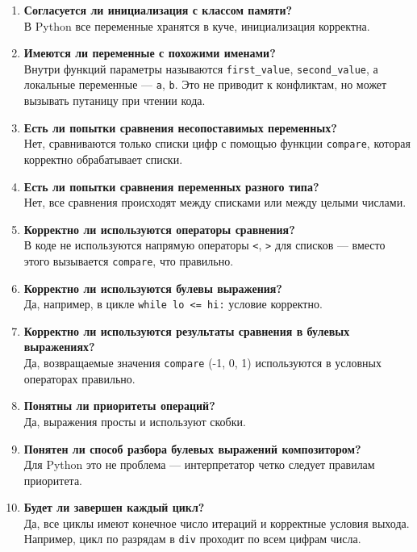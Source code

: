 \documentclass{article}[14pt]
\begin{document}
\begin{enumerate}
\item \textbf{Согласуется ли инициализация с классом памяти?}
\\
В Python все переменные хранятся в куче, инициализация корректна.

\item \textbf{Имеются ли переменные с похожими именами?}
\\
Внутри функций параметры называются \texttt{first\_value}, \texttt{second\_value}, а локальные переменные — \texttt{a}, \texttt{b}. Это не приводит к конфликтам, но может вызывать путаницу при чтении кода.

\item \textbf{Есть ли попытки сравнения несопоставимых переменных?}
\\
Нет, сравниваются только списки цифр с помощью функции \texttt{compare}, которая корректно обрабатывает списки.

\item \textbf{Есть ли попытки сравнения переменных разного типа?}
\\
Нет, все сравнения происходят между списками или между целыми числами.

\item \textbf{Корректно ли используются операторы сравнения?}
\\
В коде не используются напрямую операторы \texttt{<}, \texttt{>} для списков — вместо этого вызывается \texttt{compare}, что правильно.

\item \textbf{Корректно ли используются булевы выражения?}
\\
Да, например, в цикле \texttt{while lo <= hi:} условие корректно.

\item \textbf{Корректно ли используются результаты сравнения в булевых выражениях?}
\\
Да, возвращаемые значения \texttt{compare} (-1, 0, 1) используются в условных операторах правильно.

\item \textbf{Понятны ли приоритеты операций?}
\\
Да, выражения просты и используют скобки.

\item \textbf{Понятен ли способ разбора булевых выражений композитором?}
\\
Для Python это не проблема — интерпретатор четко следует правилам приоритета.

\item \textbf{Будет ли завершен каждый цикл?}
\\
Да, все циклы имеют конечное число итераций и корректные условия выхода. Например, цикл по разрядам в \texttt{div} проходит по всем цифрам числа.


\end{enumerate}
\end{document}
